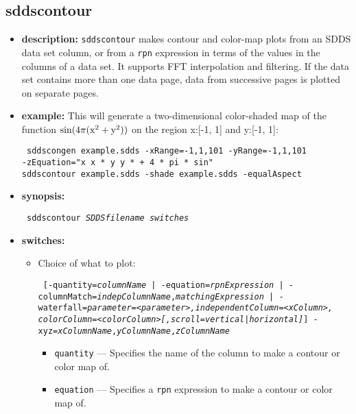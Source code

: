 \newpage
\subsection{sddscontour}
\label{sddscontour}

\begin{itemize}
\item {\bf description:} 
\verb|sddscontour| makes contour and color-map plots from an SDDS data set column, or from a \verb|rpn| expression
in terms of the values in the columns of a data set.  It supports FFT interpolation and filtering.  If the
data set contains more than one data page, data from successive pages is plotted on separate pages.

\item {\bf example:}
This will generate a two-dimensional color-shaded map of the function ${\rm sin(4\pi (x^2 + y^2))}$ on
the region x:[-1, 1] and y:[-1, 1]:
\begin{flushleft}{\tt
sddscongen example.sdds -xRange=-1,1,101 -yRange=-1,1,101 \\
-zEquation="x x * y y * + 4 * pi * sin"\\
sddscontour example.sdds -shade example.sdds -equalAspect
}\end{flushleft}
\item {\bf synopsis:}
\begin{flushleft}{\tt
sddscontour {\em SDDSfilename} {\em switches}
}\end{flushleft}
\item {\bf switches:}
    \begin{itemize}
    \item Choice of what to plot:
\begin{flushleft}{\tt
[{-quantity={\em columnName} | -equation={\em rpnExpression} | 
 -columnMatch={\em indepColumnName},{\em matchingExpression}} |
 -waterfall={\em parameter=<parameter>,independentColumn=<xColumn>, 
             colorColumn=<colorColumn>[,scroll=vertical|horizontal]}]
 -xyz={\em xColumnName},{\em yColumnName},{\em zColumnName} 
}\end{flushleft}
\begin{itemize}
        \item \verb|quantity| --- Specifies the name of the column to make a contour or color map of.
        \item \verb|equation| --- Specifies a \verb|rpn| expression to make a contour or color map of.

\end{itemize}
\end{itemize}
\end{itemize}
